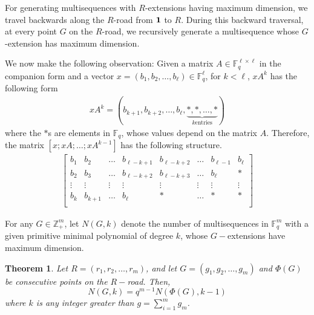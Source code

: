 \documentclass[letterpaper, 12 pt]{article}  \usepackage{amssymb}
\newtheorem{theorem}{Theorem}[section]
\newcommand{\F}{\mathbb{F}}
\begin{document}
For generating multisequences with $R$-extensions having maximum dimension, 
we travel backwards along the $R$-road from ${\bf 1}$ to $R$. During this
backward 
traversal, at every point $G$ on the $R$-road, we recursively generate a 
multisequence whose $G$-extension has maximum dimension.



We now make the following observation: Given a matrix $A\in\F_q^{\ell \times
\ell}$ in the companion form and a vector
$x = (b_1, b_2, \ldots, b_\ell) \in \F_q^{\ell}$, for $k < \ell$, $xA^k$ has the
following form
\begin{eqnarray*}
 xA^k = (b_{k+1},b_{k+2},\ldots,b_\ell,\underbrace{*,*,\ldots,*}_{k\textrm{
entries}})
\end{eqnarray*}
 where the $*$s are elements in $\F_q$, whose values depend on the matrix $A$.
Therefore, the matrix $[x; xA; \ldots; xA^{k-1}]$ has the following
structure.
\begin{eqnarray*}
\left[
 \begin{array}{cccccccc}
  b_1 & b_2 & \ldots & b_{\ell-k+1} &   b_{\ell-k+2} & \ldots & b_{\ell-1} &
b_{\ell}\\
  b_2 & b_3 & \ldots & b_{\ell-k+2} &   b_{\ell-k+3} & \ldots & b_{\ell} & *\\
  \vdots& \vdots &\vdots &\vdots &\vdots &\vdots &\vdots &\vdots\\
  b_k & b_{k+1} & \ldots & b_{\ell} & * & \ldots & * & *\\
 \end{array}
\right]
\end{eqnarray*}    

For any $G \in \mathbb{Z}_+^m$, let $N(G,k)$ denote the number of multisequences
in $\F_q^m$ with a given primitive minimal polynomial of degree $k$, whose $G-$extensions have maximum dimension.
\begin{theorem}
\label{starLemma}
Let $R = (r_1,r_2,\ldots,r_m)$, and let $G = (g_1,g_2,\ldots,g_m)$ and $\Phi(G)$
be consecutive points on the $R-$road. Then,  
\begin{equation}
 N(G,{k}) = q^{m-1}N(\Phi(G),{k-1})
\end{equation}
where $k$ is any integer greater than $g = \sum_{i=1}^mg_m$.
\end{theorem}
\end{document}
